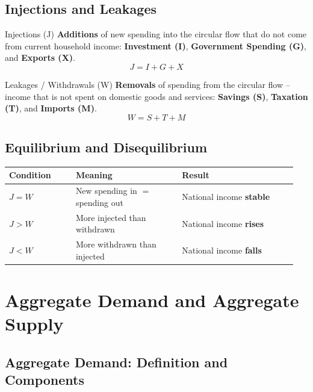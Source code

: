 \documentclass[11pt, a4paper, twoside]{book}
\begin{document}
\subsection{Injections and Leakages}

\begin{keyterm}{Injections (J)}
\textbf{Additions} of new spending into the circular flow that do not come from current household income: \textbf{Investment (I)}, \textbf{Government Spending (G)}, and \textbf{Exports (X)}.
\[
J = I + G + X
\]
\end{keyterm}

\begin{keyterm}{Leakages / Withdrawals (W)}
\textbf{Removals} of spending from the circular flow -- income that is not spent on domestic goods and services: \textbf{Savings (S)}, \textbf{Taxation (T)}, and \textbf{Imports (M)}.
\[
W = S + T + M
\]
\end{keyterm}

\subsection{Equilibrium and Disequilibrium}

\begin{tcolorbox}[enhanced,colback=LightBlue,colframe=MidBlue!70,arc=0pt,boxrule=0.8pt]
\begin{tabular}{@{}>{\RaggedRight\arraybackslash}p{0.22\linewidth}>{\RaggedRight\arraybackslash}p{0.35\linewidth}>{\RaggedRight\arraybackslash}p{0.38\linewidth}@{}}
\textbf{\color{NavyPrimary}Condition} & \textbf{\color{NavyPrimary}Meaning} & \textbf{\color{NavyPrimary}Result} \\
\midrule
$J = W$ & New spending in $=$ spending out & National income \textbf{stable} \\
$J > W$ & More injected than withdrawn & National income \textbf{rises} \\
$J < W$ & More withdrawn than injected & National income \textbf{falls} \\
\end{tabular}
\end{tcolorbox}

\section{Aggregate Demand and Aggregate Supply}

\subsection{Aggregate Demand: Definition and Components}
\end{document}

